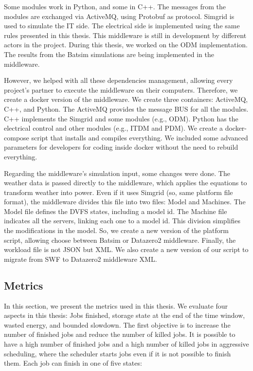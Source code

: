 Some modules work in Python, and some in C++. The messages from the modules are exchanged via ActiveMQ, using Protobuf as protocol. Simgrid is used to simulate the IT side. The electrical side is implemented using the same rules presented in this thesis. This middleware is still in development by different actors in the project. During this thesis, we worked on the ODM implementation. The results from the Batsim simulations are being implemented in the middleware. 

However, we helped with all these dependencies management, allowing every project's partner to execute the middleware on their computers. Therefore, we create a docker version of the middleware. We create three containers: ActiveMQ, C++, and Python. The ActiveMQ provides the message BUS for all the modules. C++ implements the Simgrid and some modules (e.g., ODM). Python has the electrical control and other modules (e.g., ITDM and PDM). We create a docker-compose script that installs and compiles everything. We included some advanced parameters for developers for coding inside docker without the need to rebuild everything.

Regarding the middleware's simulation input, some changes were done. The weather data is passed directly to the middleware, which applies the equations to transform weather into power. Even if it uses Simgrid (so, same platform file format), the middleware divides this file into two files: Model and Machines. The Model file defines the DVFS states, including a model id. The Machine file indicates all the servers, linking each one to a model id. This division simplifies the modifications in the model. So, we create a new version of the platform script, allowing choose between Batsim or Datazero2 middleware. Finally, the workload file is not JSON but XML. We also create a new version of our script to migrate from SWF to Datazero2 middleware XML.

\subsection{Metrics}

In this section, we present the metrics used in this thesis. We evaluate four aspects in this thesis: Jobs finished, storage state at the end of the time window, wasted energy, and bounded slowdown. The first objective is to increase the number of finished jobs and reduce the number of killed jobs. It is possible to have a high number of finished jobs and a high number of killed jobs in aggressive scheduling, where the scheduler starts jobs even if it is not possible to finish them. Each job can finish in one of five states: 

